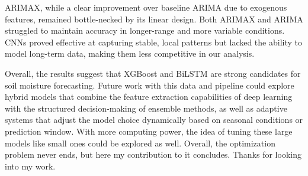 \documentclass{article}
\begin{document}
ARIMAX, while a clear improvement over baseline ARIMA due to exogenous features, remained bottle-necked by its linear design. Both ARIMAX and ARIMA struggled to maintain accuracy in longer-range and more variable conditions. CNNs proved effective at capturing stable, local patterns but lacked the ability to model long-term data, making them less competitive in our analysis.

Overall, the results suggest that XGBoost and BiLSTM are strong candidates for soil moisture forecasting. Future work with this data and pipeline could explore hybrid models that combine the feature extraction capabilities of deep learning with the structured decision-making of ensemble methods, as well as adaptive systems that adjust the model choice dynamically based on seasonal conditions or prediction window. With more computing power, the idea of tuning these large models like small ones could be explored as well. Overall, the optimization problem never ends, but here my contribution to it concludes. Thanks for looking into my work.
\end{document}
